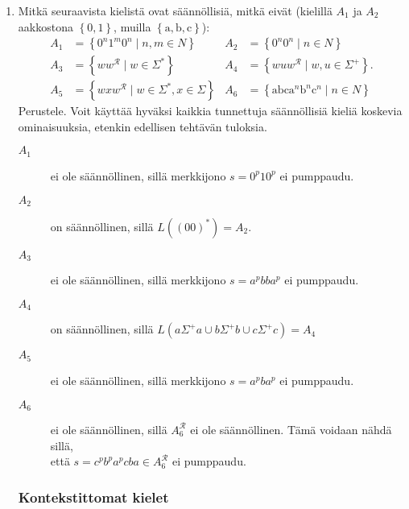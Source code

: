 \documentclass[a4paper,11pt]{article}
\newcommand{\set}[1]{{\left\{ #1 \right\}}}
\begin{document}
\begin{enumerate}
\item
  Mitkä seuraavista kielistä ovat säännöllisiä, mitkä
  eivät (kielillä $A_1$ ja $A_2$ aakkostona $\set{0,1}$, muilla
  $\set{\mathrm{a},\mathrm{b},\mathrm{c}}$):
  \begin{align*}
    A_1 &=\set{0^n1^m0^n\mid n,m\in N}
    &A_2 &=\set{0^n0^n\mid n\in N}
    \\
    A_3 &=\set{ww^\mathcal{R}\mid w\in\Sigma^{\ast}}
    &A_4 &=\set{wuw^\mathcal{R}\mid w,u\in\Sigma^+}.
    \\
    A_5 &=\set{wxw^\mathcal{R}\mid w\in\Sigma^{\ast},x\in\Sigma}
    &A_6 &=\set{\mathrm{abc}\mathrm{a}^n\mathrm{b}^n\mathrm{c}^n\mid n\in N}
  \end{align*}
  Perustele. Voit käyttää hyväksi kaikkia tunnettuja säännöllisiä kieliä
  koskevia ominaisuuksia, etenkin edellisen tehtävän tuloksia.

  \begin{description}
    \item[$A_1$] ei ole säännöllinen, sillä merkkijono $s = 0^p10^p$ ei
      pumppaudu.
    \item[$A_2$] on säännöllinen, sillä $L((00)^*) = A_2$.
    \item[$A_3$] ei ole säännöllinen, sillä merkkijono $s = a^pbba^p$ ei
      pumppaudu.
    \item[$A_4$] on säännöllinen, sillä $L(a\Sigma^+a \cup b\Sigma^+b \cup c\Sigma^+c) = A_4$
    \item[$A_5$] ei ole säännöllinen, sillä merkkijono $s = a^pba^p$ ei
      pumppaudu.
    \item[$A_6$] ei ole säännöllinen, sillä $A_6^\mathcal{R}$ ei ole
      säännöllinen. Tämä voidaan nähdä sillä,\\ että \mbox{$s =
        c^pb^pa^pcba \in A_6^\mathcal{R}$} ei pumppaudu.
  \end{description}

  \subsubsection*{Kontekstittomat kielet}


\end{enumerate}
\end{document}
